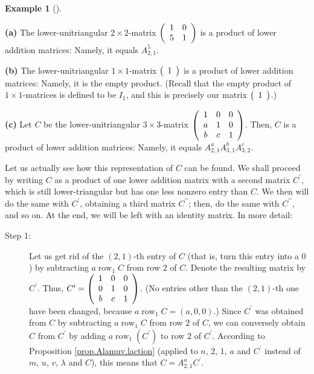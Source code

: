 \documentclass[numbers=enddot,12pt,final,onecolumn,notitlepage]{scrartcl}%
\theoremstyle{definition}
\newtheorem{exam}[theo]{Example}
\newenvironment{example}[1][]
{\begin{exam}[#1]\begin{leftbar}}
{\end{leftbar}\end{exam}}
\begin{document}
\begin{example}
\label{exam.thm.triangular.Alamuv}\textbf{(a)} The lower-unitriangular
$2\times2$-matrix $\left(
\begin{array}
[c]{cc}%
1 & 0\\
5 & 1
\end{array}
\right)  $ is a product of lower addition matrices: Namely, it equals
$A_{2,1}^{5}$.

\textbf{(b)} The lower-unitriangular $1\times1$-matrix $\left(
\begin{array}
[c]{c}%
1
\end{array}
\right)  $ is a product of lower addition matrices: Namely, it is the empty
product. (Recall that the empty product of $1\times1$-matrices is defined to
be $I_{1}$, and this is precisely our matrix $\left(
\begin{array}
[c]{c}%
1
\end{array}
\right)  $.)

\textbf{(c)} Let $C$ be the lower-unitriangular $3\times3$-matrix $\left(
\begin{array}
[c]{ccc}%
1 & 0 & 0\\
a & 1 & 0\\
b & c & 1
\end{array}
\right)  $. Then, $C$ is a product of lower addition matrices: Namely, it
equals $A_{2,1}^{a}A_{3,1}^{b}A_{3,2}^{c}$.

Let us actually see how this representation of $C$ can be found. We shall
proceed by writing $C$ as a product of one lower addition matrix with a second
matrix $C^{\prime}$, which is still lower-triangular but has one less nonzero
entry than $C$. We then will do the same with $C^{\prime}$, obtaining a third
matrix $C^{\prime\prime}$; then, do the same with $C^{\prime\prime}$, and so
on. At the end, we will be left with an identity matrix. In more detail:

\begin{description}
\item[Step 1:] Let us get rid of the $\left(  2,1\right)  $-th entry of $C$
(that is, turn this entry into a $0$) by subtracting $a\operatorname*{row}%
\nolimits_{1}C$ from row $2$ of $C$. Denote the resulting matrix by
$C^{\prime}$. Thus, $C^{\prime}=\left(
\begin{array}
[c]{ccc}%
1 & 0 & 0\\
0 & 1 & 0\\
b & c & 1
\end{array}
\right)  $. (No entries other than the $\left(  2,1\right)  $-th one have been
changed, because $a\operatorname*{row}\nolimits_{1}C=\left(  a,0,0\right)  $.)
Since $C^{\prime}$ was obtained from $C$ by subtracting $a\operatorname*{row}%
\nolimits_{1}C$ from row $2$ of $C$, we can conversely obtain $C$ from
$C^{\prime}$ by adding $a\operatorname*{row}\nolimits_{1}\left(  C^{\prime
}\right)  $ to row $2$ of $C^{\prime}$. According to Proposition
\ref{prop.Alamuv.laction} (applied to $n$, $2$, $1$, $a$ and $C^{\prime}$
instead of $m$, $u$, $v$, $\lambda$ and $C$), this means that $C=A_{2,1}%
^{a}C^{\prime}$.


\end{description}
\end{example}
\end{document}
